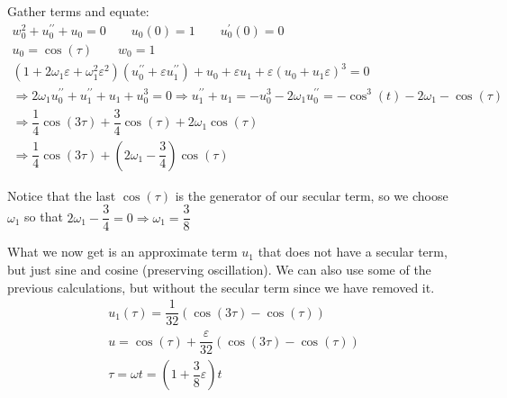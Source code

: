 \noindent Gather terms and equate:
\begin{equation*}
  \begin{gathered}
    w_0^2+u^{\prime\prime}_0+u_0=0\qquad u_0(0) =1\qquad u^{\prime}_0(0)=0\\
    u_0= \cos(\tau)\qquad w_0=1\\
    (1+2\omega_1\varepsilon+\omega_1^2\varepsilon^2)(u^{\prime\prime}_0+\varepsilon u^{\prime\prime}_1)+u_0+\varepsilon u_1+\varepsilon(u_0+u_1\varepsilon)^3=0\\
    \Rightarrow 2\omega_1 u^{\prime\prime}_0+u^{\prime\prime}_1+u_1+u_0^3=0\Rightarrow u^{\prime\prime}_1+u_1=-u_0^3-2\omega_1 u^{\prime\prime}_0 = -\cos^3(t)-2\omega_1-\cos(\tau)\\
    \Rightarrow \dfrac{1}{4}\cos(3\tau)+\dfrac{3}{4}\cos(\tau)+2\omega_1\cos(\tau)\\
    \Rightarrow \dfrac{1}{4}\cos(3\tau)+\left(2\omega_1-\dfrac{3}{4}\right)\cos(\tau)
  \end{gathered}
\end{equation*}\par
\noindent Notice that the last $\cos(\tau)$ is the generator of our secular term, so we choose $\omega_1$ so that $2\omega_1-\dfrac{3}{4}=0\Rightarrow \omega_1 = \dfrac{3}{8}$
\par\bigskip
\noindent What we now get is an approximate term $u_1$ that does not have a secular term, but just sine and cosine (preserving oscillation). We can also use some of the previous calculations, but without the secular term since we have removed it. 
\begin{equation*}
  \begin{gathered}
    u_1(\tau) = \dfrac{1}{32}\left(\cos(3\tau)-\cos(\tau)\right)\\
    u = \cos(\tau) + \dfrac{\varepsilon}{32}\left(\cos(3\tau)-\cos(\tau)\right)\\
    \tau = \omega t = (1+\dfrac{3}{8}\varepsilon)t
  \end{gathered}
\end{equation*}
